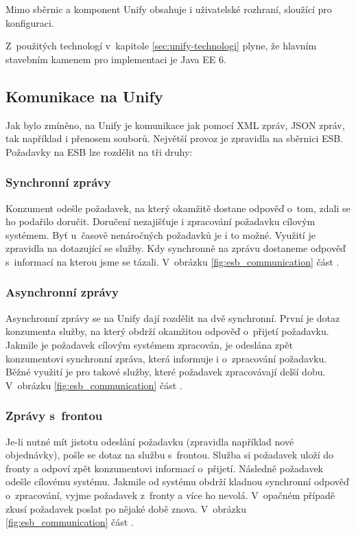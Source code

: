 \documentclass[thesis=M,czech]{FITthesis}[2012/10/20]
\begin{document}
			Mimo sběrnic a komponent Unify obsahuje i uživatelské rozhraní, sloužící pro konfiguraci. 
			
			Z~použitých technologí v~kapitole \ref{sec:unify-technologi} plyne, že hlavním stavebním kamenem pro implementaci je Java EE 6.
		
		\subsection{Komunikace na Unify}
			Jak bylo zmíněno, na Unify je komunikace jak pomocí XML zpráv, JSON zpráv, tak například i přenosem souborů. Největší provoz je zpravidla na sběrnici ESB. Požadavky na ESB lze rozdělit na tři druhy:
			
			\subsubsection{Synchronní zprávy}
				Konzument odešle požadavek, na který okamžitě dostane odpověď o~tom, zdali se ho podařilo doručit. Doručení nezajišťuje i zpracování požadavku cílovým systémem. Byť u~časově nenáročných požadavků je i to možné. Využití je zpravidla na dotazující se služby. Kdy synchronně na zprávu dostaneme odpověď s~informací na kterou jsme se tázali. V~obrázku \ref{fig:esb_communication} část .
			
			\subsubsection{Asynchronní zprávy}
				Asynchronní zprávy se na Unify dají rozdělit na dvě synchronní. První je dotaz konzumenta služby, na který obdrží okamžitou odpověď o~přijetí požadavku. Jakmile je požadavek cílovým systémem zpracován, je odeslána zpět konzumentovi synchronní zpráva, která informuje i o~zpracování požadavku. Běžné využití je pro takové služby, které požadavek zpracovávají delší dobu. V~obrázku \ref{fig:esb_communication} část .
			
			\subsubsection{Zprávy s~frontou}
				Je-li nutné mít jistotu odeslání požadavku (zpravidla například nové objednávky), pošle se dotaz na službu s~frontou. Služba si požadavek uloží do fronty a odpoví zpět konzumentovi informací o~přijetí. Následně požadavek odešle cílovému systému. Jakmile od systému obdrží kladnou synchronní odpověď o~zpracování, vyjme požadavek z~fronty a více ho nevolá. V~opačném případě zkusí požadavek poslat po nějaké době znova. V~obrázku \ref{fig:esb_communication} část .
				
\end{document}
